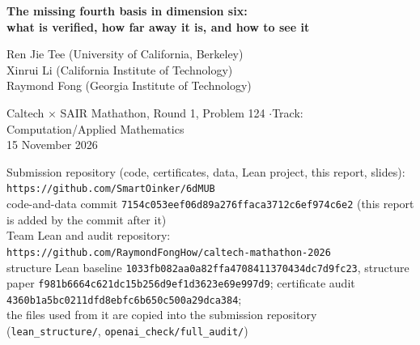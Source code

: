 \documentclass[11pt]{article}
\theoremstyle{definition}
\theoremstyle{remark}
\begin{document}
\begin{center}
{\LARGE\bfseries The missing fourth basis in dimension six:\\[2pt] what is verified, how far away it is, and how to see it\par}
\vspace{0.8em}
{\large Ren Jie Tee (University of California, Berkeley)\\
Xinrui Li (California Institute of Technology)\\
Raymond Fong (Georgia Institute of Technology)\par}
\vspace{0.5em}
Caltech $\times$ SAIR Mathathon, Round 1, Problem 124 \quad$\cdot$\quad Track: Computation/Applied Mathematics\\
15 November 2026\par
\vspace{0.4em}
{\small
Submission repository (code, certificates, data, Lean project, this report, slides): \texttt{https://github.com/SmartOinker/6dMUB}\\
code-and-data commit \texttt{7154c053eef06d89a276ffaca3712c6ef974c6e2} (this report is added by the commit after it)\\[2pt]
Team Lean and audit repository: \texttt{https://github.com/RaymondFongHow/caltech-mathathon-2026}\\
structure Lean baseline \texttt{1033fb082aa0a82ffa4708411370434dc7d9fc23}, structure paper \texttt{f981b6664c621dc15b256d9ef1d3623e69e997d9}; certificate audit
\texttt{4360b1a5bc0211dfd8ebfc6b650c500a29dca384};\\ the files used from it are copied into the submission repository (\texttt{lean\_structure/}, \texttt{openai\_check/full\_audit/})\par}
\end{center}
\end{document}
